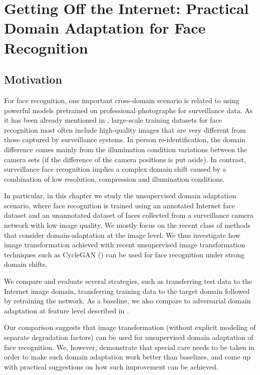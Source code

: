 

\chapter{Getting Off the Internet: Practical Domain Adaptation for Face Recognition}
\label{chapt:wildface_}


\section{Motivation}
For face recognition, one important cross-domain scenario is related to using powerful models pretrained on professional photographs for surveillance data. As it has been already mentioned in , large-scale training datasets for face recognition most often include high-quality images that are very different from those captured by surveillance systems. In person re-identification, the domain difference comes mainly from the illumination condition variations between the camera sets (if the difference of the camera positions is put aside). In contrast,  surveillance face recognition implies a complex domain shift caused by a combination of low resolution, compression and illumination conditions. 


In particular, in this chapter we study the unsupervised domain adaptation scenario, where face recognition is trained using an annotated Internet face dataset and an unannotated dataset of faces collected from a surveillance camera network with low image quality. We mostly focus on the recent class of methods that consider domain-adaptation at the image level. We thus investigate how image transformation achieved with recent unsupervised image transformation techniques such as CycleGAN (\cite{ZhuPIE17}) can be used for face recognition under strong domain shifts. 

We compare and evaluate several strategies, such as transferring test data to the Internet image domain,  transferring training data to the target domain followed by retraining the network. As a baseline, we also compare to adversarial domain adaptation at feature level described in .%

Our comparison suggests that image transformation (without explicit modeling of separate degradation factors) can be used for unsupervised domain adaptation of face recognition. We, however, demonstrate that special care needs to be taken in order to make such domain adaptation work better than baselines, and come up with practical suggestions on how such improvement can be achieved.

